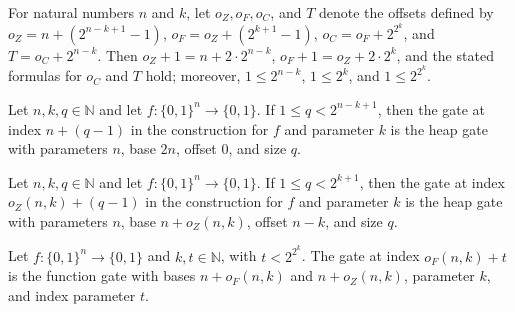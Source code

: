 \begin{theorem}
\label{BoolCircuit.Lupanov.offsets}
\leanok
{}
For natural numbers $n$ and $k$, let $o_Z,o_F,o_C$, and $T$ denote the offsets defined
by $o_Z=n+(2^{n-k+1}-1)$, $o_F=o_Z+(2^{k+1}-1)$, $o_C=o_F+2^{2^k}$, and $T=o_C+2^{n-k}$.
Then $o_Z+1=n+2\cdot2^{n-k}$, $o_F+1=o_Z+2\cdot2^k$, and the stated formulas for $o_C$
and $T$ hold; moreover, $1\le 2^{n-k}$, $1\le 2^k$, and $1\le 2^{2^k}$.
\end{theorem}

\begin{theorem}
\label{BoolCircuit.Lupanov.gateAt_y}
\leanok
{}
Let $n,k,q\in\mathbb{N}$ and let $f:\{0,1\}^n\to\{0,1\}$. If $1\le q<2^{n-k+1}$, then
the gate at index $n+(q-1)$ in the construction for $f$ and parameter $k$ is the heap
gate with parameters $n$, base $2n$, offset $0$, and size $q$.
\end{theorem}

\begin{theorem}
\label{BoolCircuit.Lupanov.gateAt_z}
\leanok
{}
Let $n,k,q\in\mathbb{N}$ and let $f:\{0,1\}^n\to\{0,1\}$. If $1\le q<2^{k+1}$, then the
gate at index $o_Z(n,k)+(q-1)$ in the construction for $f$ and parameter $k$ is the heap
gate with parameters $n$, base $n+o_Z(n,k)$, offset $n-k$, and size $q$.
\end{theorem}

\begin{theorem}
\label{BoolCircuit.Lupanov.gateAt_f}
\leanok
{}
Let $f:\{0,1\}^n\to\{0,1\}$ and $k,t\in\mathbb{N}$, with $t<2^{2^k}$. The gate at index
$o_F(n,k)+t$ is the function gate with bases $n+o_F(n,k)$ and $n+o_Z(n,k)$, parameter
$k$, and index parameter $t$.
\end{theorem}

